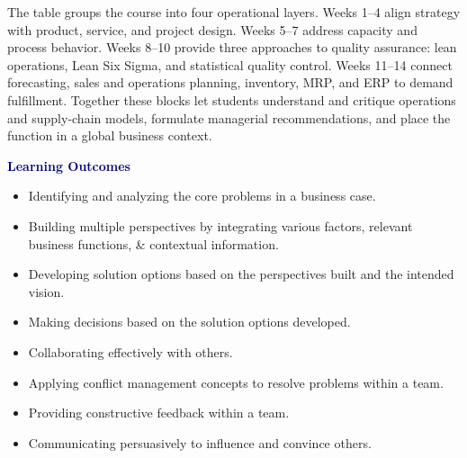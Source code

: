 \begin{visualexplanation}
The table groups the course into four operational layers. Weeks 1--4 align strategy with product, service, and project design. Weeks 5--7 address capacity and process behavior. Weeks 8--10 provide three approaches to quality assurance: lean operations, Lean Six Sigma, and statistical quality control. Weeks 11--14 connect forecasting, sales and operations planning, inventory, MRP, and ERP to demand fulfillment. Together these blocks let students understand and critique operations and supply-chain models, formulate managerial recommendations, and place the function in a global business context.
\end{visualexplanation}

\begin{minipage}[t]{.66\textwidth}\vspace{0pt}
\textcolor{navy}{\large\bfseries Learning Outcomes}\par
\begin{itemize}
\item Identifying and analyzing the core problems in a business case.
\item Building multiple perspectives by integrating various factors, relevant business functions, \& contextual information.
\item Developing solution options based on the perspectives built and the intended vision.
\item Making decisions based on the solution options developed.
\item Collaborating effectively with others.
\item Applying conflict management concepts to resolve problems within a team.
\item Providing constructive feedback within a team.
\item Communicating persuasively to influence and convince others.
\end{itemize}
\end{minipage}\hfill
\begin{minipage}[t]{.32\textwidth}\vspace{0pt}
\end{minipage}

